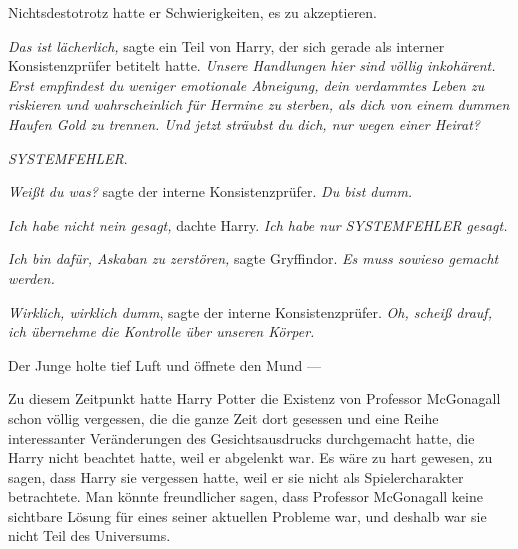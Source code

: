Nichtsdestotrotz hatte er Schwierigkeiten, es zu akzeptieren.

\emph{Das ist lächerlich,} sagte ein Teil von Harry, der sich gerade als interner Konsistenzprüfer betitelt hatte. \emph{Unsere Handlungen hier sind völlig inkohärent. Erst empfindest du weniger emotionale Abneigung, dein verdammtes \emph{Leben} zu riskieren und wahrscheinlich für Hermine zu \emph{sterben}, als dich von einem dummen Haufen Gold zu trennen. Und jetzt sträubst du dich, nur wegen einer Heirat?}

\emph{SYSTEMFEHLER}.

\emph{Weißt du was?} sagte der interne Konsistenzprüfer. \emph{Du bist dumm.}

\emph{Ich habe nicht nein gesagt,} dachte Harry. \emph{Ich habe nur SYSTEMFEHLER gesagt.}

\emph{Ich bin dafür, Askaban zu zerstören,} sagte Gryffindor. \emph{Es muss sowieso gemacht werden.}

\emph{Wirklich, wirklich dumm}, sagte der interne Konsistenzprüfer. \emph{Oh, scheiß drauf, ich übernehme die Kontrolle über unseren Körper.}

Der Junge holte tief Luft und öffnete den Mund —

Zu diesem Zeitpunkt hatte Harry Potter die Existenz von Professor McGonagall schon völlig vergessen, die die ganze Zeit dort gesessen und eine Reihe interessanter Veränderungen des Gesichtsausdrucks durchgemacht hatte, die Harry nicht beachtet hatte, weil er abgelenkt war. Es wäre zu hart gewesen, zu sagen, dass Harry sie vergessen hatte, weil er sie nicht als Spielercharakter betrachtete. Man könnte freundlicher sagen, dass Professor McGonagall keine sichtbare Lösung für eines seiner aktuellen Probleme war, und deshalb war sie nicht Teil des Universums.

